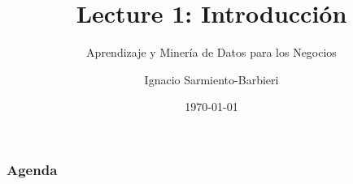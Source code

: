 \documentclass[
  shownotes,
  xcolor={svgnames},
  hyperref={colorlinks,citecolor=DarkBlue,linkcolor=DarkRed,urlcolor=DarkBlue}
  , aspectratio=169]{beamer}
\begin{document}
\title{Lecture 1: Introducción}
\subtitle{Aprendizaje y Minería de Datos para los Negocios}
\date{\today}

\author[Sarmiento-Barbieri]{Ignacio Sarmiento-Barbieri}


\begin{frame}[noframenumbering]
\maketitle
\end{frame}





\begin{frame}
\frametitle{Agenda}

\tableofcontents


\end{frame}
\end{document}
